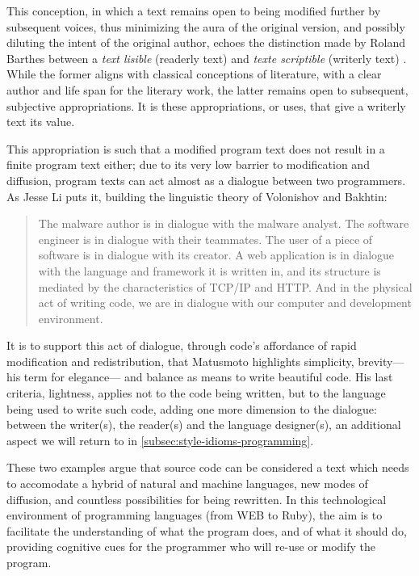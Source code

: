 This conception, in which a text remains open to being modified further by subsequent voices, thus minimizing the aura of the original version, and possibly diluting the intent of the original author, echoes the distinction made by Roland Barthes between a \emph{text lisible} (readerly text) and \emph{texte scriptible} (writerly text) \citep{barthes_sz_1977}. While the former aligns with classical conceptions of literature, with a clear author and life span for the literary work, the latter remains open to subsequent, subjective appropriations. It is these appropriations, or uses, that give a writerly text its value.

This appropriation is such that a modified program text does not result in a finite program text either; due to its very low barrier to modification and diffusion, program texts can act almost as a dialogue between two programmers. As Jesse Li puts it, building the linguistic theory of Volonishov and Bakhtin:

\begin{quote}
  The malware author is in dialogue with the malware analyst. The software engineer is in dialogue with their teammates. The user of a piece of software is in dialogue with its creator. A web application is in dialogue with the language and framework it is written in, and its structure is mediated by the characteristics of TCP/IP and HTTP. And in the physical act of writing code, we are in dialogue with our computer and development environment. \citep{li_where_2020}
\end{quote}

It is to support this act of dialogue, through code's affordance of rapid modification and redistribution, that Matusmoto highlights simplicity, brevity—his term for elegance— and balance as means to write beautiful code. His last criteria, lightness, applies not to the code being written, but to the language being used to write such code, adding one more dimension to the dialogue: between the writer(s), the reader(s) and the language designer(s), an additional aspect we will return to in \autoref{subsec:style-idioms-programming}.

These two examples argue that source code can be considered a text which needs to accomodate a hybrid of natural and machine languages, new modes of diffusion, and countless possibilities for being rewritten. In this technological environment of programming languages (from WEB to Ruby), the aim is to facilitate the understanding of what the program does, and of what it should do, providing cognitive cues for the programmer who will re-use or modify the program.

